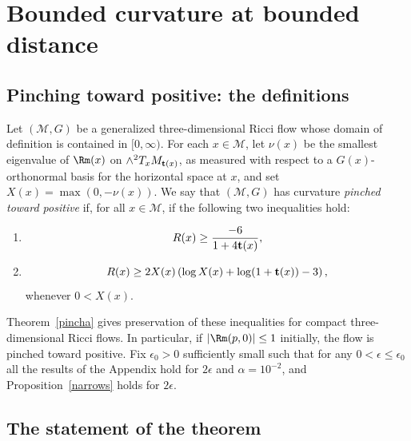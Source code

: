 \chapter{Bounded curvature at bounded distance}
\label{chap:bounded-curvature-bounded-distance}
\section{Pinching toward positive: the definitions}\label{10.1}

\begin{definition}
\label{def:curvature-pinched-toward-positive}
\label{pinchdef}
Let $({\mathcal M},G)$ be a generalized three-dimensional Ricci flow
whose domain of definition is contained in $[0,\infty)$. For each
$x\in {\mathcal M}$, let $\nu(x)$ be the smallest eigenvalue of
$\Rm(x)$ on $\wedge^2T_xM_{{\bf t}(x)}$, as measured with
respect to a $G(x)$-orthonormal basis for the horizontal space at
$x$, and set $X(x)=\max(0,-\nu(x))$. We say that $({\mathcal
M},G)$ has curvature {\em pinched toward positive} if, for all $x\in
{\mathcal M}$, if the following two inequalities hold:
\begin{enumerate}
\item[(1)] $$R(x)\ge \frac{-6}{1+4{\bf t}(x)},$$
\item[(2)] $$R(x)\geq 2X(x)\left(\log X(x)+\log
(1+{\bf t}(x))-3\right),
$$ whenever
$0<X(x)$.
\end{enumerate}
\end{definition}

Theorem~\ref{pincha} gives preservation of these inequalities for
compact three-dimensional Ricci flows. In particular, if
$|\Rm(p,0)|\le 1$ initially, the flow is pinched toward positive.
Fix $\epsilon_0>0$ sufficiently small such that for any
$0<\epsilon\le \epsilon_0$ all the results of the Appendix hold for
$2\epsilon$ and $\alpha=10^{-2}$, and Proposition~\ref{narrows}
holds for $2\epsilon$.


\section{The statement of the theorem}

